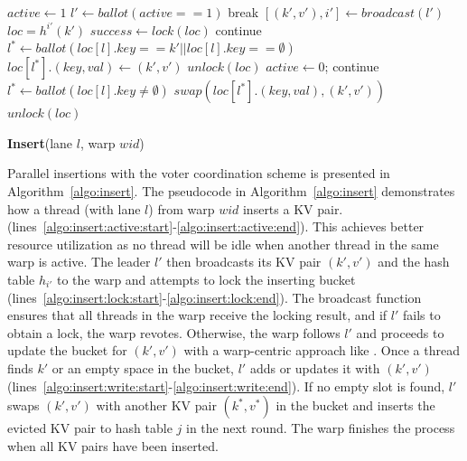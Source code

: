 \begin{algorithm}[t]
	\begin{algorithmic}[1]
		\State $active \gets 1$	\label{algo:insert:active:start}
		\State $l' \gets ballot(active == 1)$ \label{algo:insert:vote:start}
		\State break \label{algo:insert:active:end}
		\EndIf
		\State $[(k',v'),i'] \gets broadcast(l')$ \label{algo:insert:lock:start}
		\State $loc = h^{i'}(k')$
		\State $success \gets lock(loc)$ \label{algo:insert:lock:end}
		\EndIf
		\State continue					\label{algo:insert:vote:end}
		\EndIf
		\State $l^* \gets ballot(loc[l].key == k' || loc[l].key ==\emptyset)$ \label{algo:insert:write:start}
		\State $loc[l^*].(key,val) \gets (k',v')$
		\State $unlock(loc)$
		\State $active \gets 0$;
		\State continue			\label{algo:insert:write:end}
		\EndIf
		\State $l^* \gets ballot(loc[l].key \neq \emptyset)$
		\State $swap(loc[l^*].(key,val),(k',v'))$
		\State $unlock(loc)$ \label{algo:insert:loop:end}
		\EndIf
		\EndWhile
	\end{algorithmic}
	\caption{\textbf{Insert}(lane $l$, warp $wid$)}\label{algo:insert}
\end{algorithm}

Parallel insertions with the voter coordination scheme is presented in Algorithm~\ref{algo:insert}.
The pseudocode in Algorithm~\ref{algo:insert} demonstrates how a thread (with lane $l$) from warp $wid$ inserts a KV pair. 
 (lines~\ref{algo:insert:active:start}-\ref{algo:insert:active:end}).  
This achieves better resource utilization as no thread will be idle when another thread in the same warp is active.  
The leader $l'$ then broadcasts its KV pair $(k',v')$ and the hash table $h_{i'}$ to the warp and attempts to lock the inserting bucket (lines~\ref{algo:insert:lock:start}-\ref{algo:insert:lock:end}). 
The broadcast function ensures that all threads in the warp receive the locking result, and if $l'$ fails to obtain a lock, the warp revotes.
Otherwise, the warp follows $l'$ and proceeds to update the bucket for $(k',v')$ with a warp-centric approach like .
Once a thread finds $k'$ or an empty space in the bucket, $l'$ adds or updates it with $(k',v')$ (lines~\ref{algo:insert:write:start}-\ref{algo:insert:write:end}).
If no empty slot is found, $l'$ swaps $(k',v')$ with another KV pair $(k^*,v^*)$ in the bucket and inserts the evicted KV pair to hash table $j$ in the next round. 
The warp finishes the process when all KV pairs have been inserted.

